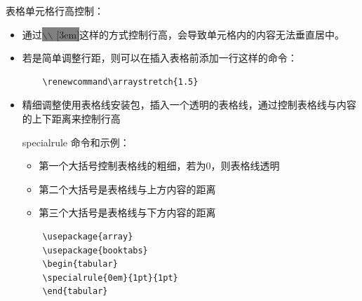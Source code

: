 \documentclass[a4paper,11pt,onecolumn]{article}
\begin{document}
\begin{table}[H]\footnotesize
\centering
\caption{7x7 table a, span rows and columns}
\label{table a:7x7 example}
\end{table}
表格单元格行高控制：
\begin{itemize}
  \item 通过\colorbox{gray}{$\backslash$$\backslash$ [3em]}这样的方式控制行高，会导致单元格内的内容无法垂直居中。
  \item 若是简单调整行距，则可以在插入表格前添加一行这样的命令：

    \begin{lstlisting}
    \renewcommand\arraystretch{1.5}
    \end{lstlisting}
  \item 精细调整使用表格线安装包，插入一个透明的表格线，通过控制表格线与内容的上下距离来控制行高

  specialrule 命令和示例：

    \begin{itemize}
      \item 第一个大括号控制表格线的粗细，若为0，则表格线透明
      \item 第二个大括号是表格线与上方内容的距离
      \item 第三个大括号是表格线与下方内容的距离
    \end{itemize}

    \begin{lstlisting}
    \usepackage{array}
    \usepackage{booktabs}
    \begin{tabular}
    \specialrule{0em}{1pt}{1pt}
    \end{tabular}
    \end{lstlisting}
\end{itemize}
\end{document}
